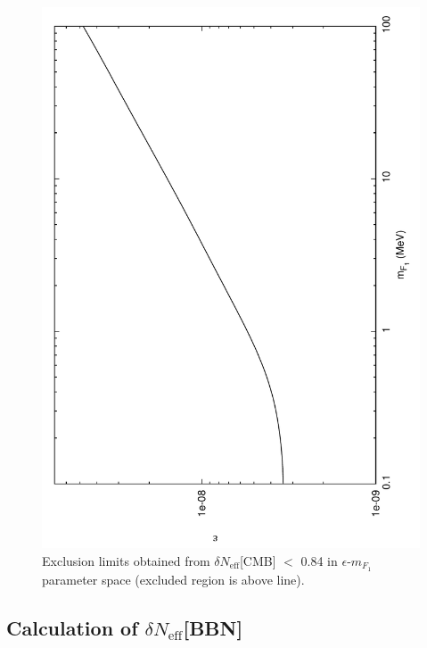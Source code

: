 \documentclass[12pt]{article}
\begin{document}
\begin{figure}[htpb]
    \centering
        \includegraphics[scale=0.5, angle=270]{fig3}
    \caption{Exclusion limits obtained from $\delta N _{\text{eff}}$[CMB] $<$ 0.84 in $\epsilon$-$m_{F_1}$ parameter space (excluded region is above line).}
    \label{fig:Exclusion cmb}
\end{figure}
%
\newpage
%
\subsection{Calculation of $\delta N _{\text{eff}}$[BBN]}
\end{document}
